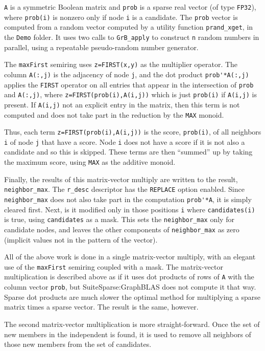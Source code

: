 \documentclass[12pt]{article}
\begin{document}
\verb'A' is a symmetric Boolean matrix and \verb'prob' is a sparse real vector
(of type \verb'FP32'), where \verb'prob(i)' is nonzero only if node \verb'i' is
a candidate.  The \verb'prob' vector is computed from a random vector computed
by a utility function \verb'prand_xget', in the \verb'Demo' folder.  It uses
two calls to \verb'GrB_apply' to construct \verb'n' random numbers in parallel,
using a repeatable pseudo-random number generator.

The \verb'maxFirst' semiring uses \verb'z=FIRST(x,y)' as the multiplier
operator.  The column \verb'A(:,j)' is the adjacency of node \verb'j', and the
dot product \verb"prob'*A(:,j)" applies the \verb'FIRST' operator on all
entries that appear in the intersection of \verb'prob' and \verb'A(:,j)', where
\verb'z=FIRST(prob(i),A(i,j))' which is just \verb'prob(i)' if \verb'A(i,j)' is
present.  If \verb'A(i,j)' not an explicit entry in the matrix, then this term
is not computed and does not take part in the reduction by the \verb'MAX'
monoid.

Thus, each term \verb'z=FIRST(prob(i),A(i,j))' is the score, \verb'prob(i)',
of all neighbors \verb'i' of node \verb'j' that have a score.  Node \verb'i'
does not have a score if it is not also a candidate and so this is skipped.
These terms are then ``summed'' up by taking the maximum score, using
\verb'MAX' as the additive monoid.

Finally, the results of this matrix-vector multiply are written to the result,
\verb'neighbor_max'.  The \verb'r_desc' descriptor has the \verb'REPLACE'
option enabled.  Since \verb'neighbor_max' does not also take part in the
computation \verb"prob'*A", it is simply cleared first.  Next, is it modified
only in those positions \verb'i' where \verb'candidates(i)' is true, using
\verb'candidates' as a mask.  This sets the \verb'neighbor_max' only for
candidate nodes, and leaves the other components of \verb'neighbor_max' as zero
(implicit values not in the pattern of the vector).

All of the above work is done in a single matrix-vector multiply, with an
elegant use of the \verb'maxFirst' semiring coupled with a mask.  The
matrix-vector multiplication is described above as if it uses dot products of
rows of \verb'A' with the column vector \verb'prob', but SuiteSparse:GraphBLAS
does not compute it that way.  Sparse dot products are much slower the optimal
method for multiplying a sparse matrix times a sparse vector.  The result is
the same, however.

The second matrix-vector multiplication is more straight-forward.  Once the set
of new members in the independent is found, it is used to remove all neighbors
of those new members from the set of candidates.
\end{document}
